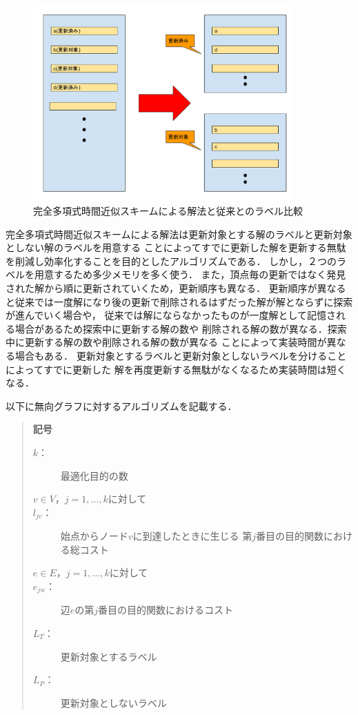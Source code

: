 \documentclass[12pt]{optlab-bachelor}
\begin{document}
\begin{figure}[htbp]
  \centering
  \caption{完全多項式時間近似スキームによる解法と従来とのラベル比較}
  \includegraphics[width=10.0cm]{fig/fig1.pdf}
\end{figure}

完全多項式時間近似スキームによる解法は更新対象とする解のラベルと更新対象としない解のラベルを用意する
ことによってすでに更新した解を更新する無駄を削減し効率化することを目的としたアルゴリズムである．
しかし，２つのラベルを用意するため多少メモリを多く使う．
また，頂点毎の更新ではなく発見された解から順に更新されていくため，更新順序も異なる．
更新順序が異なると従来では一度解になり後の更新で削除されるはずだった解が解とならずに探索が進んでいく場合や，
従来では解にならなかったものが一度解として記憶される場合があるため探索中に更新する解の数や
削除される解の数が異なる．探索中に更新する解の数や削除される解の数が異なる
ことによって実装時間が異なる場合もある．
更新対象とするラベルと更新対象としないラベルを分けることによってすでに更新した
解を再度更新する無駄がなくなるため実装時間は短くなる．


以下に無向グラフに対するアルゴリズムを記載する．

\begin{quote}
  \textbf{記号}
  \begin{description}
    \item[$k$：] 最適化目的の数
    \item[$v \in V$，$j = 1 , \ldots , k$に対して]
    \item[$l_{jv}$：] 始点からノード$v$に到達したときに生じる
    第$j$番目の目的関数における総コスト
    \item[$e \in E$，$j = 1 , \ldots , k$に対して]
    \item[$e_{jw}$：] 辺$e$の第$j$番目の目的関数におけるコスト
    \item[$L_T$：] 更新対象とするラベル
    \item[$L_P$：] 更新対象としないラベル
  \end{description}
\end{quote}
\end{document}

